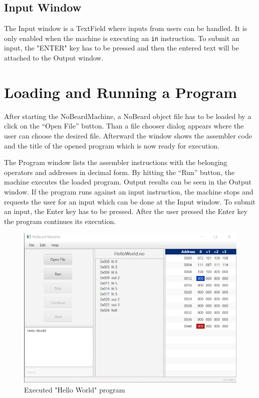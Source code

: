 \subsection{Input Window}
The Input window is a TextField where inputs from users can be handled. It is only enabled when the machine is executing an \lstinline$in$ instruction. To submit an input, the "ENTER" key has to be pressed and then the entered text will be attached to the Output window.

\section{Loading and Running a Program}
After starting the NoBeardMachine, a NoBeard object file has to be loaded by a click on the “Open File” button. Than a file chooser dialog appears where the user can choose the desired file. Afterward the window shows the assembler code and the title of the opened program which is now ready for execution.

The Program window lists the assembler instructions with the belonging operators and addresses in decimal form. By hitting the “Run” button, the machine executes the loaded program. Output results can be seen in the Output window. If the program runs against an input instruction, the machine stops and requests the user for an input which can be done at the Input window. To submit an input, the Enter key has to be pressed. After the user pressed the Enter key the program continues its execution.
\begin{figure}[h] 
	\centering
	\includegraphics[scale=.85]{images/screenshot-1.png}
	\caption{Executed "Hello World" program}
\end{figure}

